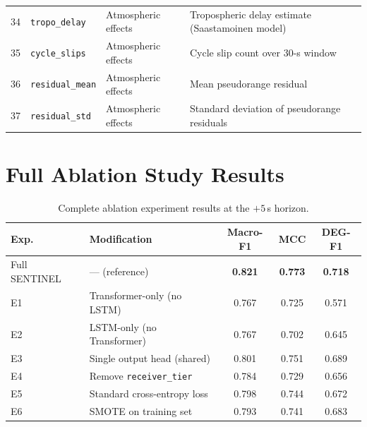 \documentclass[12pt,a4paper]{article}
\newcommand{\code}[1]{\texttt{#1}}
\begin{document}
\begin{longtable}{cllp{4.5cm}}
  34 & \code{tropo\_delay}          & Atmospheric effects   & Tropospheric delay estimate (Saastamoinen model) \\
  35 & \code{cycle\_slips}          & Atmospheric effects   & Cycle slip count over 30-s window \\
  36 & \code{residual\_mean}        & Atmospheric effects   & Mean pseudorange residual \\
  37 & \code{residual\_std}         & Atmospheric effects   & Standard deviation of pseudorange residuals \\
  \bottomrule
\end{longtable}

\section{Full Ablation Study Results}
\label{app:ablation}

\begin{table}[H]
  \centering
  \caption{Complete ablation experiment results at the $+5$\,s horizon.}
  \begin{tabular}{lp{5.5cm}ccc}
    \toprule
    \textbf{Exp.} & \textbf{Modification} & \textbf{Macro-F1} & \textbf{MCC} &
    \textbf{DEG-F1} \\
    \midrule
    Full SENTINEL & --- (reference) & \textbf{0.821} & \textbf{0.773} & \textbf{0.718} \\
    E1 & Transformer-only (no LSTM) & 0.767 & 0.725 & 0.571 \\
    E2 & LSTM-only (no Transformer) & 0.767 & 0.702 & 0.645 \\
    E3 & Single output head (shared) & 0.801 & 0.751 & 0.689 \\
    E4 & Remove \code{receiver\_tier} & 0.784 & 0.729 & 0.656 \\
    E5 & Standard cross-entropy loss & 0.798 & 0.744 & 0.672 \\
    E6 & SMOTE on training set & 0.793 & 0.741 & 0.683 \\
    \bottomrule
  \end{tabular}
\end{table}



\end{document}
